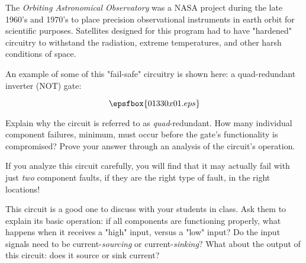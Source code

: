 

The {\it Orbiting Astronomical Observatory} was a NASA project during the late 1960's and 1970's to place precision observational instruments in earth orbit for scientific purposes.  Satellites designed for this program had to have "hardened" circuitry to withstand the radiation, extreme temperatures, and other harsh conditions of space.

An example of some of this "fail-safe" circuitry is shown here: a quad-redundant inverter (NOT) gate:

$$\epsfbox{01330x01.eps}$$

Explain why the circuit is referred to as {\it quad}-redundant.  How many individual component failures, minimum, must occur before the gate's functionality is compromised?  Prove your answer through an analysis of the circuit's operation.







If you analyze this circuit carefully, you will find that it may actually fail with just {\it two} component faults, if they are the right type of fault, in the right locations!







This circuit is a good one to discuss with your students in class.  Ask them to explain its basic operation: if all components are functioning properly, what happens when it receives a "high" input, versus a "low" input?  Do the input signals need to be current-{\it sourcing} or current-{\it sinking}?  What about the output of this circuit: does it source or sink current?



